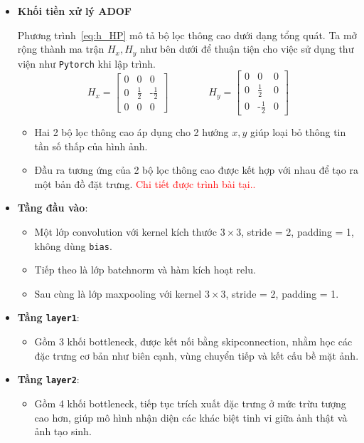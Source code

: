\begin{itemize}
	\item \textbf{Khối tiền xử lý ADOF}
	
	Phương trình~\eqref{eq:h_HP} mô tả bộ lọc thông cao dưới dạng tổng quát. Ta mở rộng thành ma trận $H_x, H_y$ như bên dưới để thuận tiện cho việc sử dụng thư viện như \texttt{Pytorch} khi lập trình.
	\[
		H_x = \begin{bmatrix}
			0 & 0 & 0 \\
			0 & \tfrac{1}{2} &  \text{-}\tfrac{1}{2} \\
			0 & 0 & 0
		\end{bmatrix} \qquad \qquad
		H_y = \begin{bmatrix}
			0 & 0 & 0 \\
			0 & \tfrac{1}{2} &  0 \\
			0 & \text{-}\tfrac{1}{2} & 0
		\end{bmatrix}
	\]
	
		\begin{itemize}
			\item Hai 2 bộ lọc thông cao áp dụng cho 2 hướng $x, y$ giúp loại bỏ thông tin tần số thấp của hình ảnh.
			\item Đầu ra tương ứng của 2 bộ lọc thông cao được kết hợp với nhau để tạo ra một bản đồ đặt trưng. \textcolor{red}{Chi tiết được trình bài tại..}
		\end{itemize}

%
	\item \textbf{Tầng đầu vào}:
		\begin{itemize}
			\item Một lớp \gls{convolution} với \gls{kernel} kích thước \(3 \times 3\), \gls{stride} = 2, \gls{padding} = 1, không dùng \texttt{bias}.
			\item Tiếp theo là lớp \gls{batchnorm} và hàm kích hoạt \gls{relu}.
			\item Sau cùng là lớp \gls{maxpooling} với \gls{kernel} \(3 \times 3\), \gls{stride} = 2, \gls{padding} = 1.
		\end{itemize}
		\item \textbf{Tầng \texttt{layer1}}:
		\begin{itemize}
			\item Gồm 3 khối \gls{bottleneck}, được kết nối bằng \gls{skipconnection}, nhằm học các đặc trưng cơ bản như biên cạnh, vùng chuyển tiếp và kết cấu bề mặt ảnh.
		\end{itemize}
		
		\item \textbf{Tầng \texttt{layer2}}:
		\begin{itemize}
			\item Gồm 4 khối \gls{bottleneck}, tiếp tục trích xuất đặc trưng ở mức trừu tượng cao hơn, giúp mô hình nhận diện các khác biệt tinh vi giữa ảnh thật và ảnh tạo sinh.
		\end{itemize}
		

\end{itemize}
